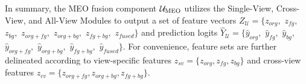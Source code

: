 In summary, the MEO fusion component $\mathcal{U}_{\text{MEO}}$ utilizes the Single-View, Cross-View, and All-View Modules to output a set of feature vectors $Z_{\mathcal{U}} = \{z_{org}, $ $z_{fg}, $ $z_{bg}, $ $z_{org+fg}, $ $z_{org+bg}, $ $z_{fg+bg}, $ $z_{fused}\}$ and prediction logits $\hat{Y}_{\mathcal{U}} = \{\hat{y}_{org}, $ $\hat{y}_{fg}, $ $\hat{y}_{bg}, $ $\hat{y}_{org+fg}, $ $\hat{y}_{org+bg}, $ $\hat{y}_{fg+bg}, $ $\hat{y}_{fused}\}$. For convenience, feature sets are further delineated according to view-specific features $z_{sv} = \{z_{org}, z_{fg}, z_{bg}\}$ and cross-view features $z_{cv} = \{z_{org+fg}, z_{org+bg}, z_{fg+bg}\}$.

